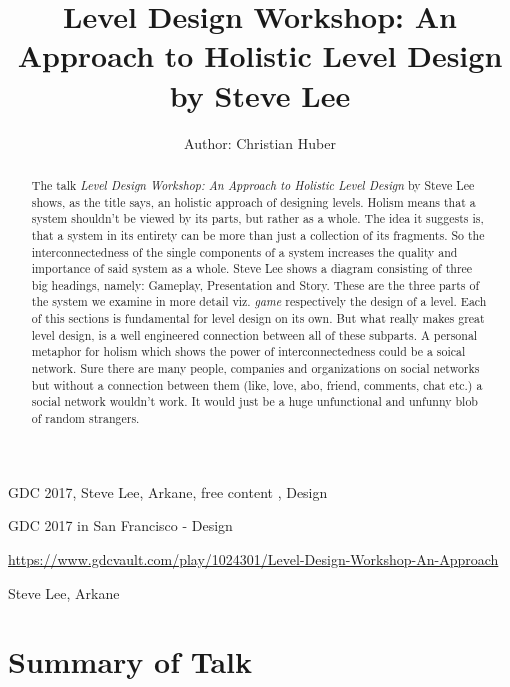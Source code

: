 \documentclass[a4paper]{article}
\title{Level Design Workshop: An Approach to Holistic Level Design by Steve Lee}
\author{Author: Christian Huber}
\begin{document}
\maketitle
\begin{keywords} GDC 2017, Steve Lee, Arkane, free content , Design\end{keywords}

\begin{track} GDC 2017 in San Francisco - Design  \end{track}

\begin{talkurl}  \url{https://www.gdcvault.com/play/1024301/Level-Design-Workshop-An-Approach} \end{talkurl}

\begin{speaker}Steve Lee, Arkane\end{speaker}


\begin{abstract}

The talk \textit{Level Design Workshop: An Approach to Holistic Level Design} by Steve Lee shows, as the title says, an holistic approach of designing levels. Holism means that a system shouldn't be viewed by its parts, but rather as a whole. The idea it suggests is, that a system in its entirety can be more than just a collection of its fragments. So the interconnectedness of the single components of a system increases the quality and importance of said system as a whole. Steve Lee shows a diagram consisting of three big headings, namely: Gameplay, Presentation and Story. These are the three parts of the system we examine in more detail viz. \textit{game} respectively the design of a level. Each of this sections is fundamental for level design on its own. But what really makes great level design, is a well engineered connection between all of these subparts. A personal metaphor for holism which shows the power of interconnectedness could be a soical network. Sure there are many people, companies and organizations on social networks but without a connection between them (like, love, abo, friend, comments, chat etc.) a social network wouldn't work. It would just be a huge unfunctional and unfunny blob of random strangers.

\end{abstract}

\section{Summary of Talk}
\end{document}
